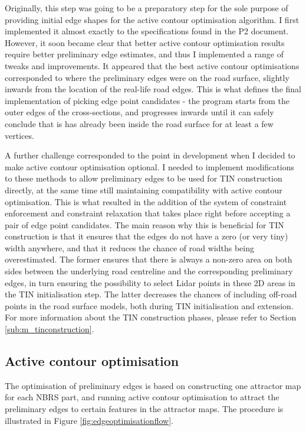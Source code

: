 Originally, this step was going to be a preparatory step for the sole purpose of providing initial edge shapes for the active contour optimisation algorithm. I first implemented it almost exactly to the specifications found in the P2 document. However, it soon became clear that better active contour optimisation results require better preliminary edge estimates, and thus I implemented a range of tweaks and improvements. It appeared that the best active contour optimisations corresponded to where the preliminary edges were on the road surface, slightly inwards from the location of the real-life road edges. This is what defines the final implementation of picking edge point candidates - the program starts from the outer edges of the cross-sections, and progresses inwards until it can safely conclude that is has already been inside the road surface for at least a few vertices.

A further challenge corresponded to the point in development when I decided to make active contour optimisation optional. I needed to implement modifications to these methods to allow preliminary edges to be used for TIN construction directly, at the same time still maintaining compatibility with active contour optimisation. This is what resulted in the addition of the system of constraint enforcement and constraint relaxation that takes place right before accepting a pair of edge point candidates. The main reason why this is beneficial for TIN construction is that it ensures that the edges do not have a zero (or very tiny) width anywhere, and that it reduces the chance of road widths being overestimated. The former ensures that there is always a non-zero area on both sides between the underlying road centreline and the corresponding preliminary edges, in turn ensuring the possibility to select Lidar points in these 2D areas in the TIN initialisation step. The latter decreases the chances of including off-road points in the road surface models, both during TIN initialisation and extension. For more information about the TIN construction phases, please refer to Section \ref{sub:m_tinconstruction}.

\subsection{Active contour optimisation}
\label{sub:m_activecontours}

The optimisation of preliminary edges is based on constructing one attractor map for each NBRS part, and running active contour optimisation to attract the preliminary edges to certain features in the attractor maps. The procedure is illustrated in Figure \ref{fig:edgeoptimisationflow}.

